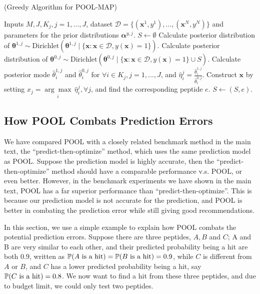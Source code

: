 \begin{Algorithm}(Greedy Algorithm for POOL-MAP) \label{algo2}
\begin{algorithmic}[1]
  \REQUIRE Inputs $M, J, K_j, j = 1, \ldots, J$, dataset $\mathcal{D} = 
  \{(\bm{x}^1, y^1), \ldots, (\bm{x}^N, y^N)\}$ and parameters for the prior 
  distributions $\bm{\alpha}^{y, j}$.
  \STATE $S \leftarrow \emptyset $
  \STATE Calculate posterior distribution of $\bm{\theta}^{1, j} \sim 
  \text{Dirichlet} (\bm{\theta}^{1, j} \mid \{\bm{x}: \bm{x} \in \mathcal{D}, 
  y(\bm{x}) = 1\})$.
    \STATE Calculate posterior distribution of $\bm{\theta}^{0, j} \sim 
    \text{Dirichlet} (\bm{\theta}^{0, j} \mid \{\bm{x}: \bm{x} \in \mathcal{D}, 
    y(\bm{x}) = 1\} \cup S)$.
    \STATE Calculate posterior mode $\hat{\theta}^{1, j}_i$ and $\hat{\theta}^{0, j}_i$ for $\forall i \in K_j, j = 1, \ldots, J$, and $\hat{\eta}^j_i = \frac{\hat{\theta}^{1, j}_i}{\hat{\theta}^{0, j}_i}$.
    \STATE Construct $\bm{x}$ by setting $x_j = \underset{i}{\arg\max} \, \hat{\eta}^j_i, \forall j$, and find the corresponding peptide $e$.
    \STATE $S \leftarrow (S, e)$.
  \ENDFOR
\end{algorithmic}
\end{Algorithm}

\subsection{How POOL Combats Prediction Errors} \label{sec:contrast with predict-then-optimize}
We have compared POOL with a closely related benchmark method in the main text, the ``predict-then-optimize'' method, which uses the same prediction model
as POOL. Suppose the prediction model is highly accurate, then the ``predict-then-optimize'' method should have a comparable performance v.s. POOL, or even
better. However, in the benchmark experiments we have shown in the main text, POOL has a far superior performance than ``predict-then-optimize''. This is
because our prediction model is not accurate for the prediction, and POOL is better in combating the prediction error while still giving good recommendations.

In this section, we use a simple example to explain how POOL combats the potential prediction errors.
Suppose there are three peptides, $A, B$ and $C$; A and B are very similar to each other, 
and their predicted probability being a hit are both $0.9$, written as $\mathbb{P} (A \text{ is a hit}) = \mathbb{P} (B \text{ is a hit}) = 0.9$, 
while $C$ is different from $A$ or $B$, and $C$ has a lower predicted probability being a hit, say $\mathbb{P} (C \text{ is a hit}) = 0.8$.
We now want to find a hit from these three peptides, and due to budget limit, we could only test two peptides.

